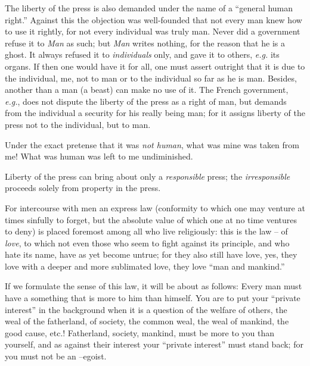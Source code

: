 The liberty of the press is also demanded under the name of a ``general human 
right.'' Against this the objection was well-founded that not every man knew 
how to use it rightly, for not every individual was truly man. Never did a 
government refuse it to \textit{Man} as such; but \textit{Man} writes nothing, 
for the reason that he is a ghost. It always refused it to 
\textit{individuals} only, and gave it to others, \textit{e.g.} its organs. 
If then one would have it for all, one must assert outright that it is due to 
the individual, me, not to man or to the individual so far as he is man. 
Besides, another than a man (a beast) can make no use of it. The French 
government, \textit{e.g.}, does not dispute the liberty of the press as a 
right of man, but demands from the individual a security for his really being 
man; for it assigns liberty of the press not to the individual, but to man.

Under the exact pretense that it was \textit{not human}, what was mine was 
taken from me! What was human was left to me undiminished.

Liberty of the press can bring about only a \textit{responsible} press; the 
\textit{irresponsible} proceeds solely from property in the press.

\myhrule

For intercourse with men an express law (conformity to which one may venture 
at times sinfully to forget, but the absolute value of which one at no time 
ventures to deny) is placed foremost among all who live religiously: this is 
the law -- of \textit{love}, to which not even those who seem to fight against 
its principle, and who hate its name, have as yet become untrue; for they also 
still have love, yes, they love with a deeper and more sublimated love, they 
love ``man and mankind.''

If we formulate the sense of this law, it will be about as follows: Every man 
must have a something that is more to him than himself. You are to put your 
``private interest'' in the background when it is a question of the welfare 
of others, the weal of the fatherland, of society, the common weal, the weal 
of mankind, the good cause, etc.! Fatherland, society, mankind, must be more 
to you than yourself, and as against their interest your ``private 
interest'' must stand back; for you must not be an --egoist.


